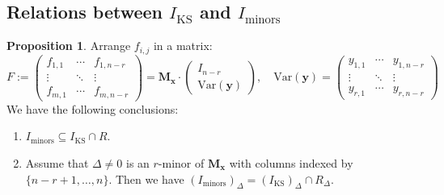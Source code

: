 \documentclass[a4paper, 11pt]{amsart}
\newcommand{\mr}[1]{\mathrm{#1}}
\newcommand{\td}[1]{\bm{#1}}
\newcommand{\tx}[1]{\text{#1}}
\theoremstyle{definition}
\newtheorem{proposition}[theorem]{Proposition}
\theoremstyle{definition}
\begin{document}
	\subsection{Relations between $I_{\mr{KS}}$ and $I_{\mr{minors}}$}
	\begin{proposition}
		Arrange $f_{i,j}$ in a matrix:
		\begin{equation*}
			F:=\begin{pmatrix}
				f_{1,1}&\cdots&f_{1,n-r}\\
				\vdots&\ddots&\vdots\\
				f_{m,1}&\cdots&f_{m,n-r}
			\end{pmatrix}
			=\td{M_x}\cdot\begin{pmatrix}
				I_{n-r}\\
				\tx{Var}(\td{y})
			\end{pmatrix},\quad\tx{Var}(\td{y})=\begin{pmatrix}
				y_{1,1}&\cdots&y_{1,n-r}\\
				\vdots&\ddots&\vdots\\
				y_{r,1}&\cdots&y_{r,n-r}
			\end{pmatrix}
		\end{equation*}
		We have the following conclusions:
		\begin{enumerate}
			\item $I_{\tx{minors}}\subseteq I_{\tx{KS}}\cap R$.
			\item Assume that $\Delta\neq 0$ is an $r$-minor of $\td{M_x}$ with columns indexed by $\{n-r+1,\dots,n\}$. Then we have $(I_{\tx{minors}})_\Delta=(I_{\tx{KS}})_\Delta\cap R_\Delta$.
		\end{enumerate}
	\end{proposition}
	
\end{document}
